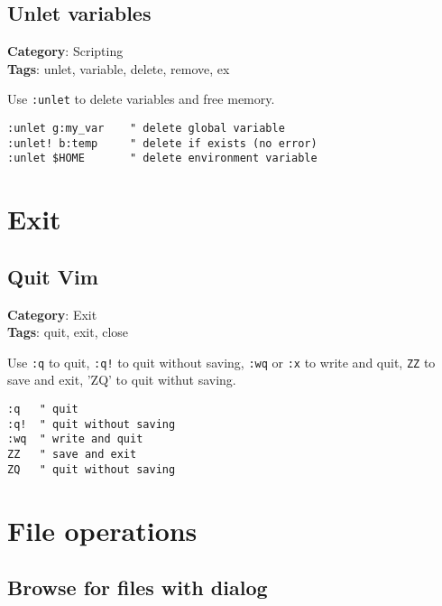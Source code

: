 {{{{{\section{Unlet variables}

\textbf{Category}: Scripting\\ \textbf{Tags}: unlet, variable, delete, remove, ex
\vspace{0.5cm}

Use {\footnotesize \Verb§:unlet§} to delete variables and free memory.

\begin{Exa*}{}
\begin{Verbatim}[fontsize=\footnotesize, breaklines, breakanywhere]
:unlet g:my_var    " delete global variable
:unlet! b:temp     " delete if exists (no error)
:unlet $HOME       " delete environment variable
\end{Verbatim}
\end{Exa*}

\chapter{Exit}
\section{Quit Vim}

\textbf{Category}: Exit\\ \textbf{Tags}: quit, exit, close
\vspace{0.5cm}

Use {\footnotesize \Verb§:q§} to quit, {\footnotesize \Verb§:q!§} to quit without saving, {\footnotesize \Verb§:wq§} or {\footnotesize \Verb§:x§} to write and quit, {\footnotesize \Verb§ZZ§} to save and exit, 'ZQ' to quit withut saving. 

\begin{Exa*}{}
\begin{Verbatim}[fontsize=\footnotesize, breaklines, breakanywhere]
:q   " quit
:q!  " quit without saving
:wq  " write and quit
ZZ   " save and exit
ZQ   " quit without saving
\end{Verbatim}
\end{Exa*}

\chapter{File operations}
\section{Browse for files with dialog}

}}}}}
